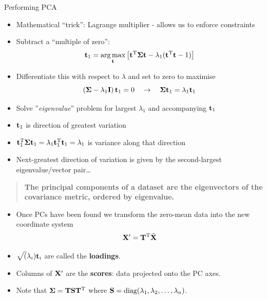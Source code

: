 \documentclass[aspectratio=169]{beamer}
\begin{document}
\begin{frame}{Performing PCA}
  \begin{itemize}
    \item Mathematical ``trick'': Lagrange multiplier - allows us to enforce constraints
    \item Subtract a ``multiple of zero'':
      \begin{equation}
        \mathbf{t}_1 = \operatorname*{arg\,max} _{\mathbf{t}} \left[\mathbf{t}^{\mathrm{T}}\mathbf{\Sigma}\mathbf{t} -\lambda_1(\mathbf{t}^{\mathrm{T}}\mathbf{t}-1)\right]
      \end{equation}
    \item Differentiate this with respect to $\lambda$ and set to zero to maximise
      \begin{equation}
        \left(\mathbf{\Sigma}-\lambda_1\mathbf{I}\right)\mathbf{t}_1 = 0\quad\rightarrow\quad \mathbf{\Sigma}\mathbf{t}_1 = \lambda_1\mathbf{t}_1
      \end{equation}
    \item Solve ''\textit{eigenvalue}'' problem for largest $\lambda_1$ and accompanying $\mathbf{t}_1$
    \item $\mathbf{t}_1$ is direction of greatest variation
    \item $\mathbf{t}_1^{\mathrm{T}}\mathbf{\Sigma}\mathbf{t}_1=\lambda_1\mathbf{t}_1^{\mathrm{T}}\mathbf{t}_1 = \lambda_1$ is variance along that direction 
    \item Next-greatest direction of variation is given by the second-largest eigenvalue/vector pair\dots
  \end{itemize}
  \begin{quote}
    \textbf{The principal components of a dataset are the eigenvectors of the covariance metric, ordered by eigenvalue.}
  \end{quote}
\end{frame}

\begin{frame}{}
  \begin{itemize}
    \item Once PCs have been found we transform the zero-mean data into the new coordinate system
    \begin{equation}
      \mathbf{X}' = \mathbf{T}^{\mathrm{T}}\tilde{\mathbf{X}}
    \end{equation}
    \item $\sqrt(\lambda_i)\mathbf{t}_i$ are called the \textbf{loadings}. 
    \item Columns of $\mathbf{X}'$ are the \textbf{scores}: data projected onto the PC axes.
    \item Note that $\mathbf{\Sigma} = \mathbf{T}\mathbf{S}\mathbf{T}^{\mathrm{T}}$ where $\mathbf{S}=\operatorname*{diag}(\lambda_1,\lambda_2,\dots,\lambda_n)$.
  \end{itemize}
\end{frame}
\end{document}
